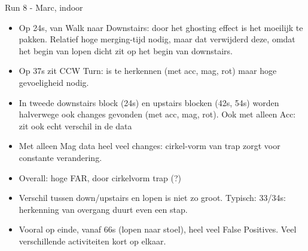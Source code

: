 Run 8 - Marc, indoor \\
\begin{itemize}
  \item Op 24s, van Walk naar Downstairs: door het ghosting effect is het moeilijk te pakken. Relatief hoge merging-tijd nodig, maar dat verwijderd deze, omdat het begin van lopen dicht zit op het begin van downstairs.
  \item Op 37s zit CCW Turn: is te herkennen (met acc, mag, rot) maar hoge gevoeligheid nodig.
  \item In tweede downstairs block (24s) en upstairs blocken (42s, 54s) worden halverwege ook changes gevonden (met acc, mag, rot). Ook met alleen Acc: zit ook echt verschil in de data
  \item Met alleen Mag data heel veel changes: cirkel-vorm van trap zorgt voor constante verandering.
  \item Overall: hoge FAR, door cirkelvorm trap (?)
  \item Verschil tussen down/upstairs en lopen is niet zo groot. Typisch: 33/34s: herkenning van overgang duurt even een stap.
  \item Vooral op einde, vanaf 66s (lopen naar stoel), heel veel False Positives. Veel verschillende activiteiten kort op elkaar.
\end{itemize}